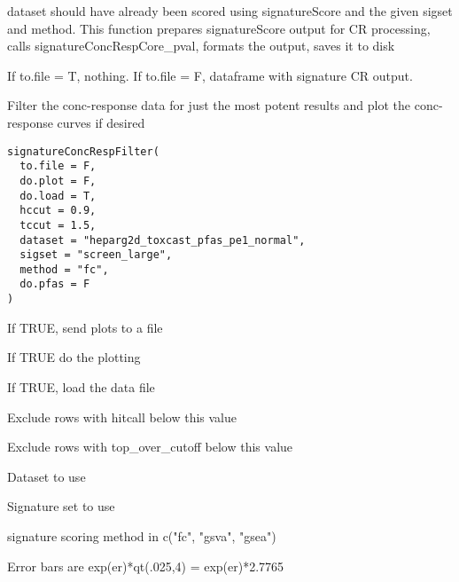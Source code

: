 \documentclass[letterpaper]{book}
\begin{document}
%
\begin{Details}\relax
dataset should have already been scored using signatureScore
and the given sigset and method. This function prepares signatureScore output
for CR processing, calls signatureConcRespCore\_pval, formats the output,
saves it to disk
\end{Details}
%
\begin{Value}
If to.file = T, nothing. If to.file = F, dataframe with signature CR
output.
\end{Value}
%
\begin{Description}\relax
Filter the conc-response data for just the most potent results
and plot the conc-response curves if desired
\end{Description}
%
\begin{Usage}
\begin{verbatim}
signatureConcRespFilter(
  to.file = F,
  do.plot = F,
  do.load = T,
  hccut = 0.9,
  tccut = 1.5,
  dataset = "heparg2d_toxcast_pfas_pe1_normal",
  sigset = "screen_large",
  method = "fc",
  do.pfas = F
)
\end{verbatim}
\end{Usage}
%
\begin{Arguments}
\begin{ldescription}
\item[\code{to.file}] If TRUE, send plots to a file

\item[\code{do.plot}] If TRUE do the plotting

\item[\code{do.load}] If TRUE, load the data file

\item[\code{hccut}] Exclude rows with hitcall below this value

\item[\code{tccut}] Exclude rows with top\_over\_cutoff below this value

\item[\code{dataset}] Dataset to use

\item[\code{sigset}] Signature set to use

\item[\code{method}] signature scoring method in c("fc", "gsva", "gsea")

\item[\code{do.pfas=F}] Error bars are exp(er)*qt(.025,4) = exp(er)*2.7765
\end{ldescription}
\end{Arguments}
\end{document}
